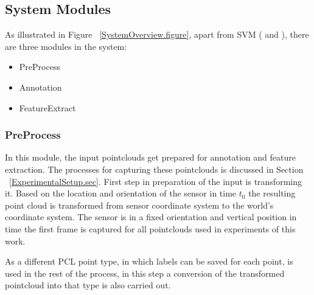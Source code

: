 % 
% 


\subsection{System Modules}
As illustrated in Figure ~\ref{SystemOverview.figure}, apart from SVM (\cite{LIBSVM} and 
\cite{li2010holistic}), there are three modules in the system:

\begin{itemize}
  \item PreProcess
  \item Annotation
  \item FeatureExtract
\end{itemize}

\subsubsection{PreProcess}
\label{PreProcess.ssec}
 In this module, the input pointclouds get prepared for annotation and feature extraction. 
 The processes for capturing these pointclouds is discussed in Section ~\ref{ExperimentalSetup.sec}. 
 First step in preparation of the input is transforming it.
 Based on the location and orientation of the sensor in time $t_0$ the resulting point cloud is transformed from 
 sensor coordinate system to the world's coordinate system.
 The sensor is in a fixed orientation and vertical position in time the first frame is captured for all pointclouds 
 used in experiments of this work.
 
 As a different PCL point type, in which labels can be saved for each point, is used in the rest of the process, 
 in this step a conversion of the transformed pointcloud into that type  is also carried out.
 
